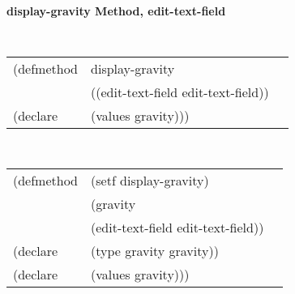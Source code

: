 %
%
%
%
%
%


{\samepage  
{\large {\bf display-gravity \hfill Method, edit-text-field}}
\begin{flushright} \parbox[t]{6.125in}{
\tt
\begin{tabular}{lll}
\raggedright
(defmethod & display-gravity & \\
& ((edit-text-field  edit-text-field)) \\
(declare & (values gravity)))
\end{tabular}
\rm

}\end{flushright}}

\begin{flushright} \parbox[t]{6.125in}{
\tt
\begin{tabular}{lll}
\raggedright
(defmethod & (setf display-gravity) & \\
         & (gravity \\
         & (edit-text-field  edit-text-field)) \\
(declare &(type gravity  gravity))\\
(declare & (values gravity)))
\end{tabular}
\rm}
\end{flushright}

